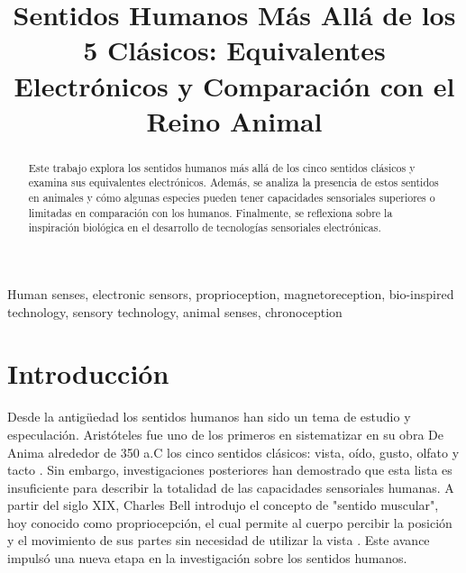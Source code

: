 \documentclass[conference]{IEEEtran}
\begin{document}
\title{Sentidos Humanos Más Allá de los 5 Clásicos: Equivalentes Electrónicos y Comparación con el Reino Animal}

\author{
}

\maketitle

\begin{abstract}
    Este trabajo explora los sentidos humanos más allá de los cinco sentidos clásicos y examina sus equivalentes electrónicos. Además, se analiza la presencia de estos sentidos en animales y cómo algunas especies pueden tener capacidades sensoriales superiores o limitadas en comparación con los humanos. Finalmente, se reflexiona sobre la inspiración biológica en el desarrollo de tecnologías sensoriales electrónicas.
\end{abstract}

\bigskip
\bigskip
\begin{IEEEkeywords}
    Human senses, electronic sensors, proprioception, magnetoreception, bio-inspired technology, sensory technology, animal senses, chronoception
\end{IEEEkeywords}


\bigskip
\section{Introducción}

Desde la antigüedad los sentidos humanos han sido un tema de estudio y especulación. Aristóteles fue uno de los primeros en sistematizar en su obra De Anima alrededor de 350 a.C los cinco sentidos clásicos: vista, oído, gusto, olfato y tacto \cite{Brandt2024}. Sin embargo, investigaciones posteriores han demostrado que esta lista es insuficiente para describir la totalidad de las capacidades sensoriales humanas. A partir del siglo XIX, Charles Bell introdujo el concepto de "sentido muscular", hoy conocido como propriocepción, el cual permite al cuerpo percibir la posición y el movimiento de sus partes sin necesidad de utilizar la vista \cite{Brandt2024}. Este avance impulsó una nueva etapa en la investigación sobre los sentidos humanos.\\
\end{document}
